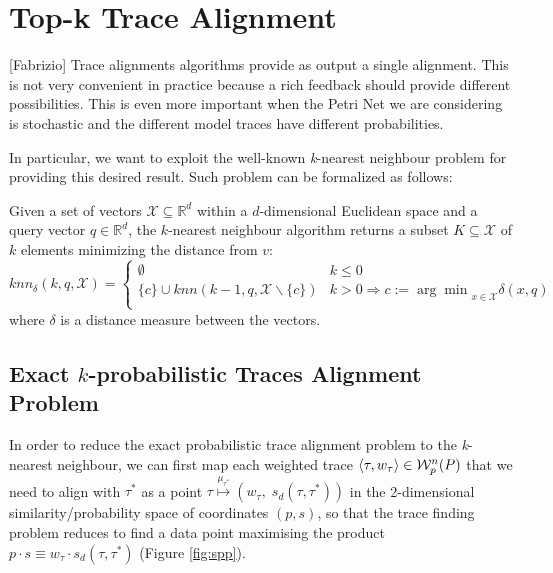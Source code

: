 \section{Top-k Trace Alignment}\label{sec:topk}
{\color{green}[Fabrizio] Trace alignments algorithms provide as output a single alignment. This is not very convenient in practice because a rich feedback should provide different possibilities. This is even more important when the Petri Net we are considering is stochastic and the different model traces have different probabilities.}

In particular, we want to exploit the well-known \textit{k}-nearest neighbour problem for providing this desired result. Such problem can be formalized as follows:
\begin{definition}
	Given a set of vectors  $\mathcal{X}\subseteq \mathbb{R}^d$ within a $d$-dimensional Euclidean space and a query vector $q\in\mathbb{R}^d$, the $k$-nearest neighbour algorithm returns a subset $K\subseteq\mathcal{X}$ of $k$ elements minimizing the distance from $v$:
	$$knn_\delta(k,q,\mathcal{X})=\begin{cases}
	\emptyset& k \leq 0\\
	\{c\}\cup knn(k-1,q,\mathcal{X}\backslash\{c\}) & k> 0 \Rightarrow c:={\arg\min}_{x\in\mathcal{X}}\delta(x,q)\\
	\end{cases}$$
	where $\delta$ is a distance measure between the vectors.
\end{definition}

\subsection{Exact $k$-probabilistic Traces Alignment Problem}\label{subsec:exbkptap}



In order to reduce the exact probabilistic trace alignment problem to the \textit{k}-nearest neighbour, we can first map each weighted trace  $\braket{\tau,w_\tau}\in\mathcal{W}_p^n(P)$ that we need to align with $\tau^*$ as a point $\tau\overset{\mu_{\tau^*}}{\mapsto}(w_\tau,\; s_d(\tau,\tau^*))$ in the 2-dimensional similarity/probability space of coordinates $(p,s)$, so that the trace finding problem reduces to find a data point maximising the product $p\cdot s\equiv w_\tau\cdot s_d(\tau,\tau^*)$ (Figure \ref{fig:spp}).

